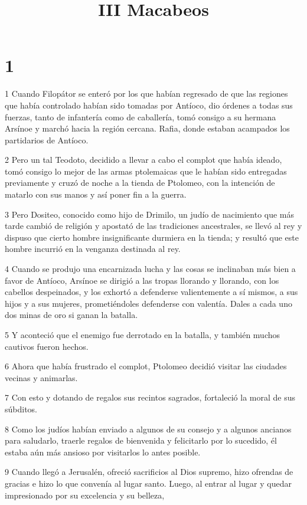 

\title{III Macabeos}


\chapter{1}

\par 1 Cuando Filopátor se enteró por los que habían regresado de que las regiones que había controlado habían sido tomadas por Antíoco, dio órdenes a todas sus fuerzas, tanto de infantería como de caballería, tomó consigo a su hermana Arsínoe y marchó hacia la región cercana. Rafia, donde estaban acampados los partidarios de Antíoco.
\par 2 Pero un tal Teodoto, decidido a llevar a cabo el complot que había ideado, tomó consigo lo mejor de las armas ptolemaicas que le habían sido entregadas previamente y cruzó de noche a la tienda de Ptolomeo, con la intención de matarlo con sus manos y así poner fin a la guerra.
\par 3 Pero Dositeo, conocido como hijo de Drimilo, un judío de nacimiento que más tarde cambió de religión y apostató de las tradiciones ancestrales, se llevó al rey y dispuso que cierto hombre insignificante durmiera en la tienda; y resultó que este hombre incurrió en la venganza destinada al rey.
\par 4 Cuando se produjo una encarnizada lucha y las cosas se inclinaban más bien a favor de Antíoco, Arsínoe se dirigió a las tropas llorando y llorando, con los cabellos despeinados, y los exhortó a defenderse valientemente a sí mismos, a sus hijos y a sus mujeres, prometiéndoles defenderse con valentía. Dales a cada uno dos minas de oro si ganan la batalla.
\par 5 Y aconteció que el enemigo fue derrotado en la batalla, y también muchos cautivos fueron hechos.
\par 6 Ahora que había frustrado el complot, Ptolomeo decidió visitar las ciudades vecinas y animarlas.
\par 7 Con esto y dotando de regalos sus recintos sagrados, fortaleció la moral de sus súbditos.
\par 8 Como los judíos habían enviado a algunos de su consejo y a algunos ancianos para saludarlo, traerle regalos de bienvenida y felicitarlo por lo sucedido, él estaba aún más ansioso por visitarlos lo antes posible.
\par 9 Cuando llegó a Jerusalén, ofreció sacrificios al Dios supremo, hizo ofrendas de gracias e hizo lo que convenía al lugar santo. Luego, al entrar al lugar y quedar impresionado por su excelencia y su belleza,
